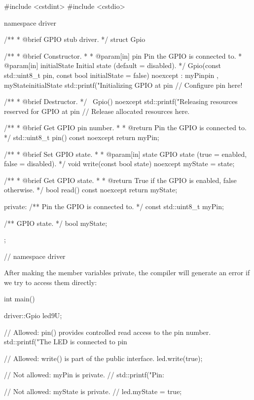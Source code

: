 \begin{cppcode}
#include <cstdint>
#include <cstdio>

namespace driver
{
/**
 * @brief GPIO stub driver.
 */
struct Gpio
{
    /**
     * @brief Constructor.
     *
     * @param[in] pin Pin the GPIO is connected to.
     * @param[in] initialState Initial state (default = disabled).
     */
    Gpio(const std::uint8_t pin, const bool initialState = false) noexcept
        : myPin{pin}
        , myState{initialState}
    {
        std::printf("Initializing GPIO at pin %
        // Configure pin here!
    }

    /**
     * @brief Destructor.
     */
    ~Gpio() noexcept
    {
        std::printf("Releasing resources reserved for GPIO at pin %
        // Release allocated resources here.
    }

    /**
     * @brief Get GPIO pin number.
     *
     * @return Pin the GPIO is connected to.
     */
    std::uint8_t pin() const noexcept { return myPin; }

    /**
     * @brief Set GPIO state.
     *
     * @param[in] state GPIO state (true = enabled, false = disabled).
     */
    void write(const bool state) noexcept { myState = state; }

    /**
     * @brief Get GPIO state.
     *
     * @return True if the GPIO is enabled, false otherwise.
     */
    bool read() const noexcept { return myState; }

private:
    /** Pin the GPIO is connected to. */
    const std::uint8_t myPin;

    /** GPIO state. */
    bool myState;
};
} // namespace driver
\end{cppcode}

\noindent After making the member variables private, the compiler will generate an error if we try
to access them directly:

\begin{cppcode}
int main()
{
    driver::Gpio led{9U};

    // Allowed: pin() provides controlled read access to the pin number.
    std::printf("The LED is connected to pin %

    // Allowed: write() is part of the public interface.
    led.write(true);

    // Not allowed: myPin is private.
    // std::printf("Pin: %

    // Not allowed: myState is private.
    // led.myState = true;
}
\end{cppcode}

